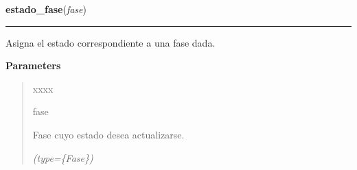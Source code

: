 \hspace{.8\funcindent}\begin{boxedminipage}{\funcwidth}

    \raggedright \textbf{estado\_fase}(\textit{fase})

    \vspace{-1.5ex}

    \rule{\textwidth}{0.5\fboxrule}
\setlength{\parskip}{2ex}
    Asigna el estado correspondiente a una fase dada.

\setlength{\parskip}{1ex}
      \textbf{Parameters}
      \vspace{-1ex}

      \begin{quote}
        \begin{Ventry}{xxxx}

          \item[fase]

          Fase cuyo estado desea actualizarse.

            {\it (type=\{Fase\})}

        \end{Ventry}

      \end{quote}

    \end{boxedminipage}

    \label{saip:lib:func:sucesor}

    \vspace{0.5ex}

